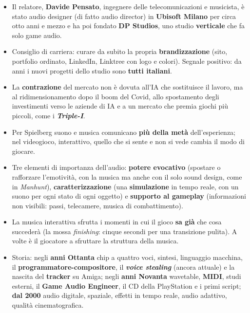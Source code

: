 \begin{itemize}
  \item Il relatore, \textbf{Davide Pensato}, ingegnere delle telecomunicazioni
        e musicista, è stato audio designer (di fatto audio director) in
        \textbf{Ubisoft Milano} per circa otto anni e mezzo e ha poi fondato
        \textbf{DP Studios}, uno studio \textbf{verticale} che fa solo game
        audio.
  \item Consiglio di carriera: curare da subito la propria
        \textbf{brandizzazione} (sito, portfolio ordinato, LinkedIn, Linktree con
        logo e colori). Segnale positivo: da anni i nuovi progetti dello studio
        sono \textbf{tutti italiani}.
  \item La \textbf{contrazione} del mercato non è dovuta all'IA che sostituisce
        il lavoro, ma al ridimensionamento dopo il boom del Covid, allo
        spostamento degli investimenti verso le aziende di IA e a un mercato che
        premia giochi più piccoli, come i \textbf{\emph{Triple-I}}.
  \item Per Spielberg suono e musica comunicano \textbf{più della metà}
        dell'esperienza; nel videogioco, interattivo, quello che si sente e non
        si vede cambia il modo di giocare.
  \item Tre elementi di importanza dell'audio: \textbf{potere evocativo}
        (spostare o rafforzare l'emotività, con la musica ma anche con il solo
        sound design, come in \emph{Manhunt}), \textbf{caratterizzazione} (una
        \textbf{simulazione} in tempo reale, con un suono per ogni stato di ogni
        oggetto) e \textbf{supporto al gameplay} (informazioni non visibili:
        passi, telecamere, musica di combattimento).
  \item La musica interattiva sfrutta i momenti in cui il gioco \textbf{sa già}
        che cosa succederà (la mossa \emph{finishing}: cinque secondi per una
        transizione pulita). A volte è il giocatore a sfruttare la struttura
        della musica.
  \item Storia: negli \textbf{anni Ottanta} chip a quattro voci, sintesi,
        linguaggio macchina, il \textbf{programmatore-compositore}, il
        \textbf{\emph{voice stealing}} (ancora attuale) e la nascita del
        \textbf{tracker} su Amiga; negli \textbf{anni Novanta} wavetable,
        \textbf{MIDI}, studi esterni, il \textbf{Game Audio Engineer}, il CD della
        PlayStation e i primi script; \textbf{dal 2000} audio digitale, spaziale,
        effetti in tempo reale, audio adattivo, qualità cinematografica.

\end{itemize}
